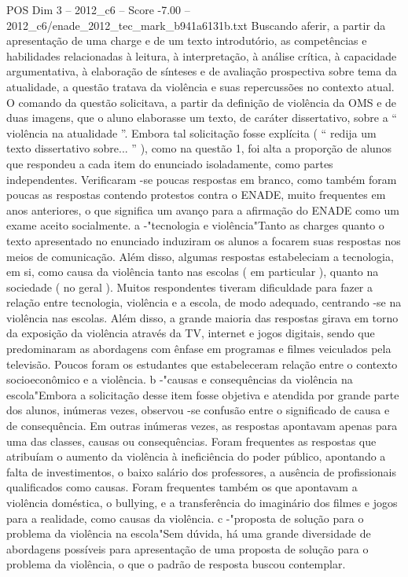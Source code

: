 \begin{textsample}{POS Dim 3 – 2012\_c6 – Score -7.00 – 2012\_c6/enade\_2012\_tec\_mark\_b941a6131b.txt}
Buscando aferir, a partir da apresentação de uma charge e de um texto introdutório, as competências e habilidades relacionadas à leitura, à interpretação, à análise crítica, à capacidade argumentativa, à elaboração de sínteses e de avaliação prospectiva sobre tema da atualidade, a questão tratava da violência e suas repercussões no contexto atual.
O comando da questão solicitava, a partir da definição de violência da OMS e de duas imagens, que o aluno elaborasse um texto, de caráter dissertativo, sobre a “ violência na atualidade ”.
Embora tal solicitação fosse explícita ( “ redija um texto dissertativo sobre... ” ), como na questão 1, foi alta a proporção de alunos que respondeu a cada item do enunciado isoladamente, como partes independentes.
Verificaram -se poucas respostas em branco, como também foram poucas as respostas contendo protestos contra o ENADE, muito frequentes em anos anteriores, o que significa um avanço para a afirmação do ENADE como um exame aceito socialmente. a -"tecnologia e violência"Tanto as charges quanto o texto apresentado no enunciado induziram os alunos a focarem suas respostas nos meios de comunicação.
Além disso, algumas respostas estabeleciam a tecnologia, em si, como causa da violência tanto nas escolas ( em particular ), quanto na sociedade ( no geral ).
Muitos respondentes tiveram dificuldade para fazer a relação entre tecnologia, violência e a escola, de modo adequado, centrando -se na violência nas escolas.
Além disso, a grande maioria das respostas girava em torno da exposição da violência através da TV, internet e jogos digitais, sendo que predominaram as abordagens com ênfase em programas e filmes veiculados pela televisão.
Poucos foram os estudantes que estabeleceram relação entre o contexto socioeconômico e a violência. b -"causas e consequências da violência na escola"Embora a solicitação desse item fosse objetiva e atendida por grande parte dos alunos, inúmeras vezes, observou -se confusão entre o significado de causa e de consequência.
Em outras inúmeras vezes, as respostas apontavam apenas para uma das classes, causas ou consequências.
Foram frequentes as respostas que atribuíam o aumento da violência à ineficiência do poder público, apontando a falta de investimentos, o baixo salário dos professores, a ausência de profissionais qualificados como causas.
Foram frequentes também os que apontavam a violência doméstica, o bullying, e a transferência do imaginário dos filmes e jogos para a realidade, como causas da violência. c -"proposta de solução para o problema da violência na escola"Sem dúvida, há uma grande diversidade de abordagens possíveis para apresentação de uma proposta de solução para o problema da violência, o que o padrão de resposta buscou contemplar.

\end{textsample}
